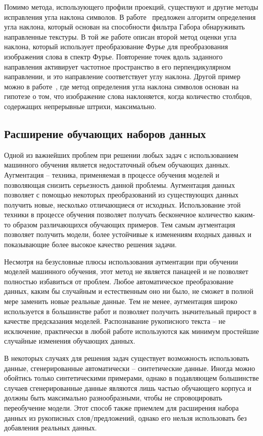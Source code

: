 Помимо метода, использующего профили проекций, существуют и другие методы исправления угла наклона символов.
В работе~\cite{gupta2012novel} предложен алгоритм определения угла наклона, который основан на способности фильтра Габора обнаруживать направленные текстуры.
В той же работе описан второй метод оценки угла наклона, который использует преобразование Фурье для преобразования изображения слова в спектр Фурье.
Повторение точек вдоль заданного направления активирует частотное пространство в его перпендикулярном направлении, и это направление соответствует углу наклона.
Другой пример можно в работе~\cite{vinciarelli2001new}, где метод определения угла наклона символов основан на гипотезе о том,
что изображение слова наклоняется, когда количество столбцов, содержащих непрерывные штрихи, максимально.


\subsection{Расширение обучающих наборов данных}
\label{subsec:augmentation-generation}

Одной из важнейших проблем при решении любых задач с использованием машинного обучения является недостаточный объем обучающих данных.
Аугментация -- техника, применяемая в процессе обучения моделей и позволяющая снизить серьезность данной проблемы.
Аугментация данных позволяет с помощью некоторых преобразований из существующих данных получить новые, несколько отличающиеся от исходных.
Использование этой техники в процессе обучения позволяет получать бесконечное количество каким-то образом различающихся обучающих примеров.
Тем самым аугментация позволяет получить модели, более устойчивые к изменениям входных данных и показывающие более высокое качество решения задачи.

Несмотря на безусловные плюсы использования аугментации при обучении моделей машинного обучения, этот метод не является панацеей и не позволяет полностью избавиться от проблем.
Любое автоматическое преобразование данных, каким бы случайным и естественным оно ни было, не сможет в полной мере заменить новые реальные данные.
Тем не менее, аугментация широко используется в большинстве работ и позволяет получить значительный прирост в качестве предсказания моделей.
Распознавание рукописного текста -- не исключение, практически в любой работе используются как минимум простейшие случайные изменения обучающих данных.

В некоторых случаях для решения задач существует возможность использовать данные, сгенерированные автоматически -- синтетические данные.
Иногда можно обойтись только синтетическими примерами, однако в подавляющем большинстве случаев сгенерированные данные
являются лишь частью обучающего корпуса и должны быть максимально разнообразными, чтобы не спровоцировать переобучение модели.
Этот способ также приемлем для расширения набора данных из рукописных слов/предложений, однако его нельзя использовать без добавления реальных данных.

